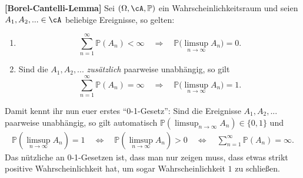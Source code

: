 \begin{satz}\label{BC}
 \textbf{[Borel-Cantelli-Lemma]}
	Sei $(\Omega, \cA, \mathbb{P})$ ein Wahrscheinlichkeitsraum und seien $A_1,A_2,... \in \cA$ beliebige Ereignisse, so gelten:
	\begin{enumerate}[label=(\roman*)]
		\item \[ \sum\limits_{n = 1}^{\infty} \mathbb{P}(A_n) < \infty \quad \Rightarrow\quad  \mathbb{P}\big(\limsup\limits_{n \to \infty} A_n\big) =0. \]
		\item Sind die $A_1, A_2, ...$ \textit{zusätzlich} paarweise unabhängig, so gilt \[ \sum\limits_{n = 1}^{\infty} \mathbb{P}(A_n) = \infty \quad \Rightarrow \quad \mathbb{P}\big(\limsup\limits_{n \to \infty} A_n\big) = 1. \]
	\end{enumerate}
\end{satz}
	Damit kennt ihr nun euer erstes \enquote{0-1-Gesetz}: Sind die Ereignisse $A_1, A_2, ...$ paarweise unabh\"angig, so gilt automatisch $\mathbb P(\limsup_{n\to\infty} A_n)\in \{0,1\}$ und
	\begin{align*}
		\mathbb P(\limsup_{n\to\infty}A_n)=1\quad \Longleftrightarrow \quad\mathbb P(\limsup_{n\to\infty}A_n)>0\quad \Longleftrightarrow \quad  \sum_{n=1}^\infty \mathbb P(A_n)=\infty.
	\end{align*}
	 Das n\"utzliche an 0-1-Gesetzen ist, dass man nur zeigen muss, dass etwas strikt positive Wahrscheinlichkeit hat, um sogar Wahrscheinlichkeit $1$ zu schlie\ss en. 


